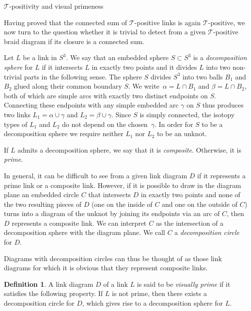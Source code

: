 \documentclass{amsart}
\makeatletter
\renewcommand\subsection{\@startsection{subsection}{2}%
  \z@{-.5\linespacing\@plus-.7\linespacing}{.5\linespacing}%
  {\normalfont\scshape}}
\theoremstyle{definition}
\newtheorem{definition}{Definition}[section]
\theoremstyle{remark}
\theoremstyle{plain}
\newcommand{\T}{\mathcal{T}}
\makeatother
\begin{document}
\subsection{\texorpdfstring{$\T$-positivity}{T-positivity} and visual primeness}

Having proved that the connected sum of $\mathcal{T}$-positive links is again $\mathcal{T}$-positive, we now turn to the question whether it is trivial to detect from a given $\mathcal{T}$-positive braid diagram if its closure is a connected sum.

Let $L$ be a link in $S^3$. We say that an embedded sphere $S\subset S^3$ is a \textit{decomposition sphere} for $L$ if it intersects $L$ in exactly two points and it divides $L$ into two non-trivial parts in the following sense. The sphere $S$ divides $S^3$ into two balls $B_1$ and $B_2$ glued along their common boundary $S$. We write~$\alpha= L\cap B_1$ and $\beta=L\cap B_2$, both of which are simple arcs with exactly two distinct endpoints on $S$. Connecting these endpoints with any simple embedded arc $\gamma$ on $S$ thus produces two links $L_1=\alpha\cup \gamma$ and $L_2=\beta\cup\gamma$. Since $S$ is simply connected, the isotopy types of $L_1$ and $L_2$ do not depend on the chosen~$\gamma$. In order for $S$ to be a decomposition sphere we require neither $L_1$ nor $L_2$ to be an unknot.

If $L$ admits a decomposition sphere, we say that it is \textit{composite}. Otherwise, it is \textit{prime}.

In general, it can be difficult to see from a given link diagram $D$ if it represents a prime link or a composite link. However, if it is possible to draw in the diagram plane an embedded circle $C$ that intersects $D$ in exactly two points and none of the two resulting pieces of $D$ (one on the inside of $C$ and one on the outside of $C$) turns into a diagram of the unknot by joining its endpoints via an arc of $C$, then $D$ represents a composite link. We can interpret $C$ as the intersection of a decomposition sphere with the diagram plane. We call $C$ a \emph{decomposition circle} for $D$.

Diagrams with decomposition circles can thus be thought of as those link diagrams for which it is obvious that they represent composite links.

\begin{definition}
A link diagram $D$ of a link $L$ is said to be \emph{visually prime} if it satisfies the following property. If $L$ is not prime, then there exists a decomposition circle for $D$, which gives rise to a decomposition sphere for $L$.
\end{definition}
\end{document}
